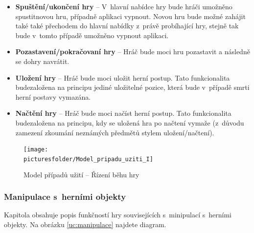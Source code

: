 \documentclass[12pt,a4paper]{article}
\def\picturesfolder{obrazky}
\begin{document}
\begin {itemize}
\item{\textbf{Spuštění/ukončení hry} --  V~hlavní nabídce hry bude hráči
  umožněno spustitnovou hru, případně aplikaci vypnout. Novou hru bude možné
  zahájit také také přechodem do hlavní nabídky z~právě probíhající hry, stejně
  tak bude v~tomto případě umožněno vypnout aplikaci.}
\item{\textbf{Pozastavení/pokračovaní hry} --  Hráč bude moci hru pozastavit a
  následně se dohry navrátit.}
\item{\textbf{Uložení hry} --  Hráč bude moci uložit herní postup. Tato
  funkcionalita budezaložena na principu jediné uložitelné pozice, která bude
v~případě smrti herní postavy vymazána.}
\item{\textbf{Načtění hry} --  Hráč bude moci načíst herní postup. Tato
  funkcionalita budezaložena na principu, kdy se uložená hra po načtení vymaže
  (z~důvodu zamezení zkoumání neznámých předmětů stylem uložení/načtení).}
\end {itemize}

\begin{figure}
\begin{center}
  \texttt{[image: \\picturesfolder/Model\_pripadu\_uziti\_I]}
  \caption{Model případů užití -- Řízení běhu hry}
  \label{uc:rizenibehu}
\end{center}
\end{figure}

\subsubsection{Manipulace s~herními objekty}

Kapitola obsahuje popis funkčností hry souvisejících s~minipulací s~herními
objekty. Na obrázku \ref{uc:manipulace} najdete diagram.
\end{document}
